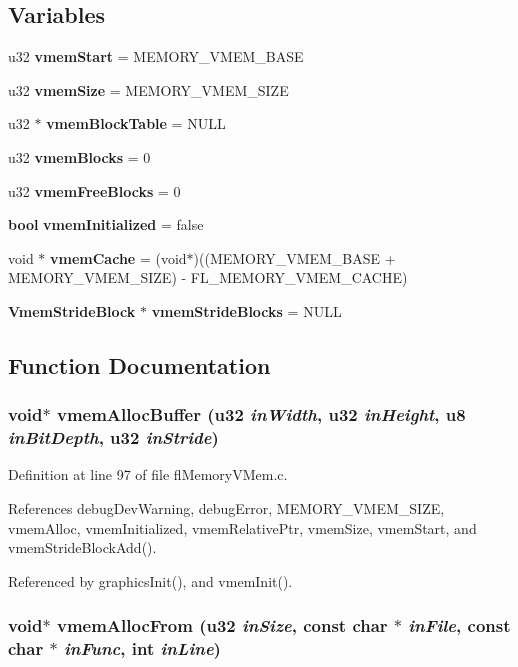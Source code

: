 \subsection*{Variables}
\begin{CompactItemize}
\item 
u32 {\bf vmem\-Start} = MEMORY\_\-VMEM\_\-BASE
\item 
u32 {\bf vmem\-Size} = MEMORY\_\-VMEM\_\-SIZE
\item 
u32 $\ast$ {\bf vmem\-Block\-Table} = NULL
\item 
u32 {\bf vmem\-Blocks} = 0
\item 
u32 {\bf vmem\-Free\-Blocks} = 0
\item 
{\bf bool} {\bf vmem\-Initialized} = false
\item 
void $\ast$ {\bf vmem\-Cache} = (void$\ast$)((MEMORY\_\-VMEM\_\-BASE + MEMORY\_\-VMEM\_\-SIZE) - FL\_\-MEMORY\_\-VMEM\_\-CACHE)
\item 
{\bf Vmem\-Stride\-Block} $\ast$ {\bf vmem\-Stride\-Blocks} = NULL
\end{CompactItemize}


\subsection{Function Documentation}
\subsubsection{\setlength{\rightskip}{0pt plus 5cm}void$\ast$ vmem\-Alloc\-Buffer (u32 {\em in\-Width}, u32 {\em in\-Height}, u8 {\em in\-Bit\-Depth}, u32 {\em in\-Stride})}\label{flMemoryVMem_8c_e971a3895e09e6afd7520db283258211}




Definition at line 97 of file fl\-Memory\-VMem.c.

References debug\-Dev\-Warning, debug\-Error, MEMORY\_\-VMEM\_\-SIZE, vmem\-Alloc, vmem\-Initialized, vmem\-Relative\-Ptr, vmem\-Size, vmem\-Start, and vmem\-Stride\-Block\-Add().

Referenced by graphics\-Init(), and vmem\-Init().
\subsubsection{\setlength{\rightskip}{0pt plus 5cm}void$\ast$ vmem\-Alloc\-From (u32 {\em in\-Size}, const char $\ast$ {\em in\-File}, const char $\ast$ {\em in\-Func}, int {\em in\-Line})}\label{flMemoryVMem_8c_fc3b16b88f6442e62ab9aacc0947e2c4}




